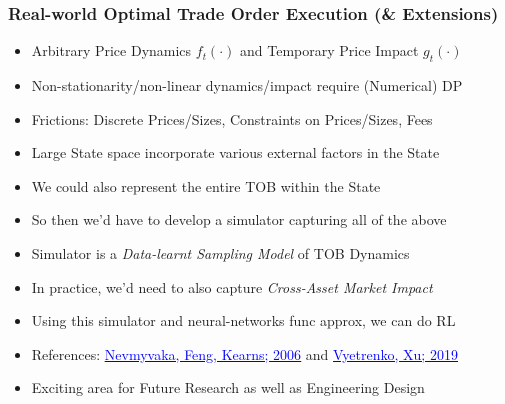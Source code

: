 \documentclass[handout]{beamer}
\begin{document}
\begin{frame}
\frametitle{Real-world Optimal Trade Order Execution (\& Extensions)}
\pause
\begin{itemize}[<+->]
\item Arbitrary Price Dynamics $f_t(\cdot)$ and Temporary Price Impact $g_t(\cdot)$
\item Non-stationarity/non-linear dynamics/impact require (Numerical) DP
\item Frictions: Discrete Prices/Sizes, Constraints on Prices/Sizes, Fees
\item Large State space incorporate various external factors in the State
\item We could also represent the entire TOB within the State
\item So then we'd have to develop a simulator capturing all of the above
\item Simulator is a {\em Data-learnt Sampling Model} of TOB Dynamics 
\item In practice, we'd need to also capture {\em Cross-Asset Market Impact}
\item Using this simulator and neural-networks func approx, we can do RL
\item References: \href{https://www.cis.upenn.edu/~mkearns/papers/rlexec.pdf}{\underline{\textcolor{blue}{Nevmyvaka, Feng, Kearns; 2006}}} and \href{https://arxiv.org/pdf/1906.02312.pdf}{\underline{\textcolor{blue}{Vyetrenko, Xu; 2019}}}
\item Exciting area for Future Research as well as Engineering Design
\end{itemize}
\end{frame}
\end{document}
